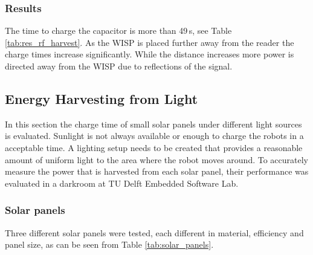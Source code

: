 \subsubsection{Results}
The time to charge the capacitor is more than 49\,s, see Table \ref{tab:res_rf_harvest}.
As the WISP is placed further away from the reader the charge times increase significantly.
While the distance increases more power is directed away from the WISP due to reflections of the signal.

\subsection{Energy Harvesting from Light}

In this section the charge time of small solar panels under different light sources is evaluated.
Sunlight is not always available or enough to charge the robots in a acceptable time.
A lighting setup needs to be created that provides a reasonable amount of uniform light to the area where the robot moves around.
To accurately measure the power that is harvested from each solar panel, their performance was evaluated in a darkroom at TU Delft Embedded Software Lab.

\subsubsection{Solar panels}
Three different solar panels were tested, each different in material, efficiency and panel size, as can be seen from Table \ref{tab:solar_panels}.

\begin{table}[t]
	\centering
\end{table}


